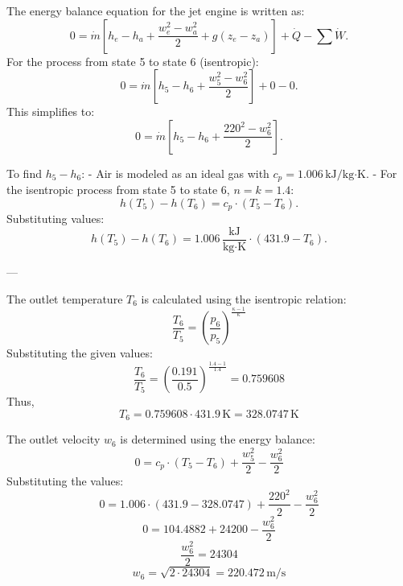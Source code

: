 The energy balance equation for the jet engine is written as:  
\[
0 = \dot{m} \left[ h_e - h_a + \frac{w_e^2 - w_a^2}{2} + g(z_e - z_a) \right] + \dot{Q} - \sum \dot{W}.
\]  
For the process from state 5 to state 6 (isentropic):  
\[
0 = \dot{m} \left[ h_5 - h_6 + \frac{w_5^2 - w_6^2}{2} \right] + 0 - 0.
\]  
This simplifies to:  
\[
0 = \dot{m} \left[ h_5 - h_6 + \frac{220^2 - w_6^2}{2} \right].
\]  

To find \( h_5 - h_6 \):  
- Air is modeled as an ideal gas with \( c_p = 1.006 \, \text{kJ/kg·K} \).  
- For the isentropic process from state 5 to state 6, \( n = k = 1.4 \):  
\[
h(T_5) - h(T_6) = c_p \cdot (T_5 - T_6).
\]  
Substituting values:  
\[
h(T_5) - h(T_6) = 1.006 \, \frac{\text{kJ}}{\text{kg·K}} \cdot (431.9 - T_6).
\]  

---

The outlet temperature \( T_6 \) is calculated using the isentropic relation:  
\[
\frac{T_6}{T_5} = \left( \frac{p_6}{p_5} \right)^{\frac{\kappa-1}{\kappa}}
\]  
Substituting the given values:  
\[
\frac{T_6}{T_5} = \left( \frac{0.191}{0.5} \right)^{\frac{1.4-1}{1.4}} = 0.759608
\]  
Thus,  
\[
T_6 = 0.759608 \cdot 431.9 \, \text{K} = 328.0747 \, \text{K}
\]  

The outlet velocity \( w_6 \) is determined using the energy balance:  
\[
0 = c_p \cdot (T_5 - T_6) + \frac{w_5^2}{2} - \frac{w_6^2}{2}
\]  
Substituting the values:  
\[
0 = 1.006 \cdot (431.9 - 328.0747) + \frac{220^2}{2} - \frac{w_6^2}{2}
\]  
\[
0 = 104.4882 + 24200 - \frac{w_6^2}{2}
\]  
\[
\frac{w_6^2}{2} = 24304
\]  
\[
w_6 = \sqrt{2 \cdot 24304} = 220.472 \, \text{m/s}
\]